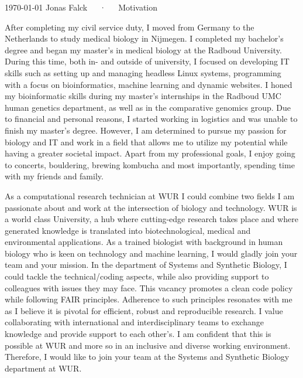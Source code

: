 \documentclass[11pt, a4paper]{awesome-cv}
\begin{document}
\makecvheader[R]

\makecvfooter
  {\today}
  {Jonas Falck~~~·~~~Motivation}
  {}

\makelettertitle

\begin{cvletter}

After completing my civil service duty, I moved from Germany to the Netherlands to study medical biology in Nijmegen. 
I completed my bachelor’s degree and began my master's in medical biology at the Radboud University. 
During this time, both in- and outside of university, I focused on developing IT skills such as setting up and managing headless Linux systems, programming with a focus on bioinformatics, machine learning and dynamic websites. 
I honed my bioinformatic skills during my master's internships in the Radboud UMC human genetics department, as well as in the comparative genomics group. 
Due to financial and personal reasons, I started working in logistics and was unable to finish my master’s degree. 
However, I am determined to pursue my passion for biology and IT and work in a field that allows me to utilize my potential while having a greater societal impact.
Apart from my professional goals, I enjoy going to concerts, bouldering, brewing kombucha and most importantly, spending time with my friends and family.

As a computational research technician at WUR I could combine two fields I am passionate about and work at the intersection of biology and technology.
WUR is a world class University, a hub where cutting-edge research takes place and where generated knowledge is translated into biotechnological, medical and environmental applications.
As a trained biologist with background in human biology who is keen on technology and machine learning, I would gladly join your team and your mission.
In the department of Systems and Synthetic Biology, I could tackle the technical/coding aspects, while also providing support to colleagues with issues they may face.
This vacancy promotes a clean code policy while following FAIR principles. 
Adherence to such principles resonates with me as I believe it is pivotal for efficient, robust and reproducible research.
I value collaborating with international and interdisciplinary teams to exchange knowledge and provide support to each other’s.
I am confident that this is possible at WUR and more so in an inclusive and diverse working environment.
Therefore, I would like to join your team at the Systems and Synthetic Biology department at WUR.


\end{cvletter}
\end{document}
